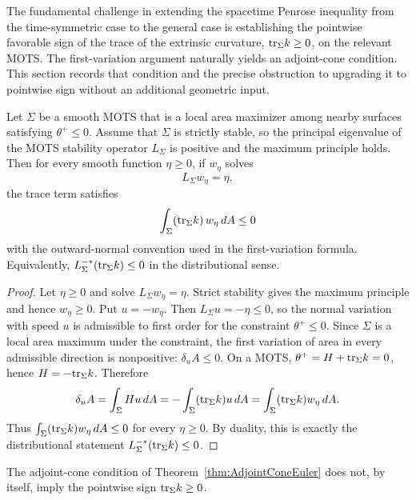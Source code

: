 The fundamental challenge in extending the spacetime Penrose inequality from the time-symmetric case to the general case is establishing the pointwise favorable sign of the trace of the extrinsic curvature, $\mathrm{tr}_\Sigma k \ge 0$, on the relevant MOTS. The first-variation argument naturally yields an adjoint-cone condition. This section records that condition and the precise obstruction to upgrading it to pointwise sign without an additional geometric input.

\begin{theorem}\label{thm:AdjointConeEuler}
Let $\Sigma$ be a smooth MOTS that is a local area maximizer among nearby surfaces satisfying $\theta^+\le0$. Assume that $\Sigma$ is strictly stable, so the principal eigenvalue of the MOTS stability operator $L_\Sigma$ is positive and the maximum principle holds. Then for every smooth function $\eta\ge0$, if $w_\eta$ solves
\[
    L_\Sigma w_\eta=\eta,
\]
the trace term satisfies
\[
    \int_\Sigma (\mathrm{tr}_\Sigma k)\,w_\eta\,dA \le 0
\]
with the outward-normal convention used in the first-variation formula. Equivalently, $L_\Sigma^{-*}(\mathrm{tr}_\Sigma k)\le0$ in the distributional sense.
\end{theorem}

\begin{proof}
Let $\eta\ge0$ and solve $L_\Sigma w_\eta=\eta$. Strict stability gives the maximum principle and hence $w_\eta\ge0$. Put $u=-w_\eta$. Then $L_\Sigma u=-\eta\le0$, so the normal variation with speed $u$ is admissible to first order for the constraint $\theta^+\le0$.
Since $\Sigma$ is a local area maximum under the constraint, the first variation of area in every admissible direction is nonpositive: $\delta_u A\le0$.
On a MOTS, $\theta^+=H+\mathrm{tr}_\Sigma k=0$, hence $H=-\mathrm{tr}_\Sigma k$. Therefore
\[
    \delta_u A=\int_\Sigma H u\,dA =-\int_\Sigma (\mathrm{tr}_\Sigma k)u\,dA =\int_\Sigma (\mathrm{tr}_\Sigma k)w_\eta\,dA.
\]
Thus $\int_\Sigma(\mathrm{tr}_\Sigma k)w_\eta\,dA\le0$ for every $\eta\ge0$. By duality, this is exactly the distributional statement $L_\Sigma^{-*}(\mathrm{tr}_\Sigma k)\le0$.
\end{proof}

\begin{theorem}\label{thm:NoGoVariational}
The adjoint-cone condition of Theorem~\ref{thm:AdjointConeEuler} does not, by itself, imply the pointwise sign $\mathrm{tr}_\Sigma k\ge0$.
\end{theorem}


